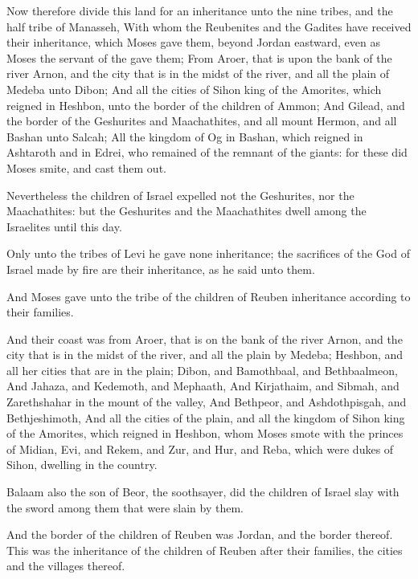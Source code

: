 \Verse Now therefore divide this land for an inheritance unto the nine tribes, and the half tribe of Manasseh, \Verse With whom the Reubenites and the Gadites have received their inheritance, which Moses gave them, beyond Jordan eastward, even as Moses the servant of the \LORD gave them; \Verse From Aroer, that is upon the bank of the river Arnon, and the city that is in the midst of the river, and all the plain of Medeba unto Dibon; \Verse And all the cities of Sihon king of the Amorites, which reigned in Heshbon, unto the border of the children of Ammon; \Verse And Gilead, and the border of the Geshurites and Maachathites, and all mount Hermon, and all Bashan unto Salcah; \Verse All the kingdom of Og in Bashan, which reigned in Ashtaroth and in Edrei, who remained of the remnant of the giants: for these did Moses smite, and cast them out.

\Verse Nevertheless the children of Israel expelled not the Geshurites, nor the Maachathites: but the Geshurites and the Maachathites dwell among the Israelites until this day.

\Verse Only unto the tribes of Levi he gave none inheritance; the sacrifices of the \LORD God of Israel made by fire are their inheritance, as he said unto them.

\Verse And Moses gave unto the tribe of the children of Reuben inheritance according to their families.

\Verse And their coast was from Aroer, that is on the bank of the river Arnon, and the city that is in the midst of the river, and all the plain by Medeba; \Verse Heshbon, and all her cities that are in the plain; Dibon, and Bamothbaal, and Bethbaalmeon, \Verse And Jahaza, and Kedemoth, and Mephaath, \Verse And Kirjathaim, and Sibmah, and Zarethshahar in the mount of the valley, \Verse And Bethpeor, and Ashdothpisgah, and Bethjeshimoth, \Verse And all the cities of the plain, and all the kingdom of Sihon king of the Amorites, which reigned in Heshbon, whom Moses smote with the princes of Midian, Evi, and Rekem, and Zur, and Hur, and Reba, which were dukes of Sihon, dwelling in the country.

\Verse Balaam also the son of Beor, the soothsayer, did the children of Israel slay with the sword among them that were slain by them.

\Verse And the border of the children of Reuben was Jordan, and the border thereof. This was the inheritance of the children of Reuben after their families, the cities and the villages thereof.

